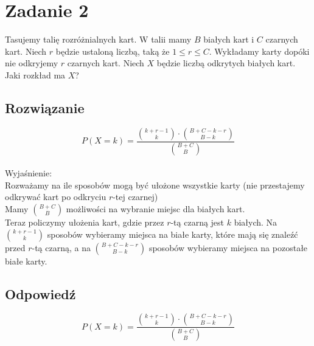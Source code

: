 \section{Zadanie 2}
Tasujemy talię rozróżnialnych kart. W talii mamy \(B\) białych kart i \(C\) czarnych kart. Niech \(r\) będzie ustaloną liczbą, taką że \(1 \leq r \leq C\). Wykładamy karty dopóki nie odkryjemy \(r\) czarnych kart. Niech \(X\) będzie liczbą odkrytych białych kart. Jaki rozkład ma \(X\)?

\subsection*{Rozwiązanie}
\[
	P(X=k) = \frac{\binom{k+r-1}{k}\cdot \binom{B+C-k-r}{B-k}}{\binom{B+C}{B}}
\]\\
Wyjaśnienie: \\
Rozważamy na ile sposobów mogą być ułożone wszystkie karty (nie przestajemy odkrywać kart po odkryciu \(r\)-tej czarnej)\\
Mamy \(\binom{B+C}{B}\) możliwości na wybranie miejsc dla białych kart.\\
Teraz policzymy ułożenia kart, gdzie przez \(r\)-tą czarną jest \(k\) białych. Na \(\binom{k+r-1}{k}\) sposobów wybieramy miejsca na białe karty, które mają się znaleźć przed \(r\)-tą czarną, a na \(\binom{B+C-k-r}{B-k}\) sposobów wybieramy miejsca na pozostałe białe karty.

\subsection*{Odpowiedź}
\[
	\boxed{\text{\(P(X=k) = \frac{\binom{k+r-1}{k} \cdot \binom{B+C-k-r}{B-k}}{\binom{B+C}{B}}\)}}
\]

